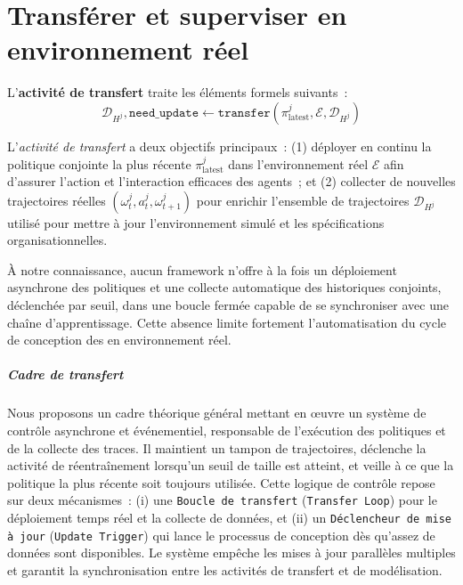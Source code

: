 \clearpage
\thispagestyle{empty}
\null
\newpage

\chapter{Transférer et superviser en environnement réel}
\label{chap:transferring}

\noindent L'\textbf{activité de transfert} traite les éléments formels suivants~:
\[
  \mathcal{D}_{H^j}, \texttt{need\_update} \gets \texttt{transfer}(\pi^j_{\text{latest}}, \mathcal{E}, \mathcal{D}_{H^j})
\]

L'\textit{activité de transfert} a deux objectifs principaux~: (1) déployer en continu la politique conjointe la plus récente $\pi^j_{\text{latest}}$ dans l'environnement réel $\mathcal{E}$ afin d'assurer l'action et l'interaction efficaces des agents~; et (2) collecter de nouvelles trajectoires réelles $(\omega^j_t, a^j_t, \omega^j_{t+1})$ pour enrichir l'ensemble de trajectoires $\mathcal{D}_{H^j}$ utilisé pour mettre à jour l'environnement simulé et les spécifications organisationnelles.

À notre connaissance, aucun framework n'offre à la fois un déploiement asynchrone des politiques et une collecte automatique des historiques conjoints, déclenchée par seuil, dans une boucle fermée capable de se synchroniser avec une chaîne d'apprentissage. Cette absence limite fortement l'automatisation du cycle de conception des  en environnement réel.

\paragraph{Cadre de transfert}

Nous proposons un cadre théorique général mettant en œuvre un système de contrôle asynchrone et événementiel, responsable de l'exécution des politiques et de la collecte des traces. Il maintient un tampon de trajectoires, déclenche la activité de réentraînement lorsqu'un seuil de taille est atteint, et veille à ce que la politique la plus récente soit toujours utilisée. Cette logique de contrôle repose sur deux mécanismes~:
(i) une \texttt{Boucle de transfert} (\texttt{Transfer Loop}) pour le déploiement temps réel et la collecte de données, et
(ii) un \texttt{Déclencheur de mise à jour} (\texttt{Update Trigger}) qui lance le processus de conception dès qu'assez de données sont disponibles. Le système empêche les mises à jour parallèles multiples et garantit la synchronisation entre les activités de transfert et de modélisation.

